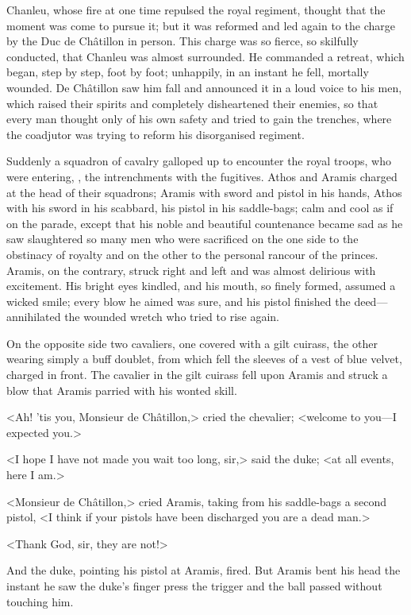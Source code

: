 Chanleu, whose fire at one time repulsed the royal regiment, thought that the moment was come to pursue it; but it was reformed and led again to the charge by the Duc de Châtillon in person. This charge was so fierce, so skilfully conducted, that Chanleu was almost surrounded. He commanded a retreat, which began, step by step, foot by foot; unhappily, in an instant he fell, mortally wounded. De Châtillon saw him fall and announced it in a loud voice to his men, which raised their spirits and completely disheartened their enemies, so that every man thought only of his own safety and tried to gain the trenches, where the coadjutor was trying to reform his disorganised regiment.

Suddenly a squadron of cavalry galloped up to encounter the royal troops, who were entering, , the intrenchments with the fugitives. Athos and Aramis charged at the head of their squadrons; Aramis with sword and pistol in his hands, Athos with his sword in his scabbard, his pistol in his saddle-bags; calm and cool as if on the parade, except that his noble and beautiful countenance became sad as he saw slaughtered so many men who were sacrificed on the one side to the obstinacy of royalty and on the other to the personal rancour of the princes. Aramis, on the contrary, struck right and left and was almost delirious with excitement. His bright eyes kindled, and his mouth, so finely formed, assumed a wicked smile; every blow he aimed was sure, and his pistol finished the deed—annihilated the wounded wretch who tried to rise again.

On the opposite side two cavaliers, one covered with a gilt cuirass, the other wearing simply a buff doublet, from which fell the sleeves of a vest of blue velvet, charged in front. The cavalier in the gilt cuirass fell upon Aramis and struck a blow that Aramis parried with his wonted skill.

<Ah! 'tis you, Monsieur de Châtillon,> cried the chevalier; <welcome to you—I expected you.>

<I hope I have not made you wait too long, sir,> said the duke; <at all events, here I am.>

<Monsieur de Châtillon,> cried Aramis, taking from his saddle-bags a second pistol, <I think if your pistols have been discharged you are a dead man.>

<Thank God, sir, they are not!>

And the duke, pointing his pistol at Aramis, fired. But Aramis bent his head the instant he saw the duke's finger press the trigger and the ball passed without touching him.

